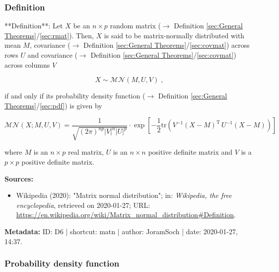\documentclass[a4paper,12pt,twoside]{book}
\begin{document}
\subsubsection[\textit{Definition}]{Definition} \label{sec:matn}
\setcounter{equation}{0}

**Definition**: Let $X$ be an $n \times p$ random matrix ($\rightarrow$ Definition \ref{sec:General Theorems}/\ref{sec:rmat}). Then, $X$ is said to be matrix-normally distributed with mean $M$, covariance ($\rightarrow$ Definition \ref{sec:General Theorems}/\ref{sec:covmat}) across rows $U$ and covariance ($\rightarrow$ Definition \ref{sec:General Theorems}/\ref{sec:covmat}) across columns $V$

\begin{equation} \label{eq:matn-matn}
X \sim \mathcal{MN}(M, U, V) \; ,
\end{equation}

if and only if its probability density function ($\rightarrow$ Definition \ref{sec:General Theorems}/\ref{sec:pdf}) is given by

\begin{equation} \label{eq:matn-matn-pdf}
\mathcal{MN}(X; M, U, V) = \frac{1}{\sqrt{(2\pi)^{np} |V|^n |U|^p}} \cdot \exp\left[-\frac{1}{2} \mathrm{tr}\left( V^{-1} (X-M)^\mathrm{T} \, U^{-1} (X-M) \right) \right]
\end{equation}

where $M$ is an $n \times p$ real matrix, $U$ is an $n \times n$ positive definite matrix and $V$ is a $p \times p$ positive definite matrix.


\vspace{1em}
\textbf{Sources:}
\begin{itemize}
\item Wikipedia (2020): "Matrix normal distribution"; in: \textit{Wikipedia, the free encyclopedia}, retrieved on 2020-01-27; URL: \url{https://en.wikipedia.org/wiki/Matrix_normal_distribution#Definition}.
\end{itemize}


\vspace{1em}
\textbf{Metadata:} ID: D6 | shortcut: matn | author: JoramSoch | date: 2020-01-27, 14:37.
\vspace{1em}



\subsubsection[\textbf{Probability density function}]{Probability density function} \label{sec:matn-pdf}
\setcounter{equation}{0}
\end{document}
